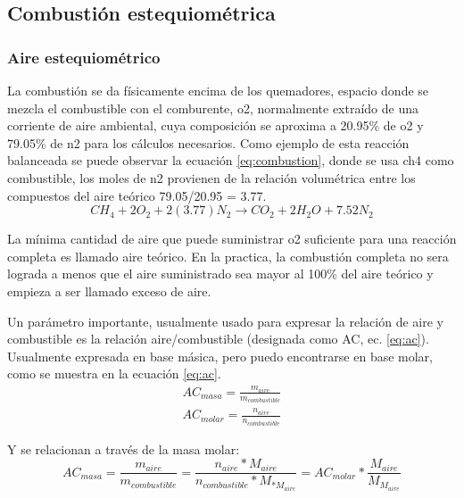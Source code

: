\subsection{Combustión estequiométrica}
\subsubsection{Aire estequiométrico}
\par La combustión se da físicamente encima de los quemadores, espacio donde se mezcla el combustible con el comburente, \ac{o2}, normalmente extraído de una corriente de aire ambiental, cuya composición se aproxima a 20.95\% de \ac{o2} y 79.05\% de \ac{n2} para los cálculos necesarios. Como ejemplo de esta reacción balanceada se puede observar la ecuación \ref{eq:combustion}, donde se usa \ac{ch4} como combustible, los moles de \ac{n2} provienen de la relación volumétrica entre los compuestos del aire teórico 79.05/20.95 = 3.77.
\begin{equation}
    \label{eq:combustion}
    CH_4 + 2O_2 + 2(3.77)N_2 \rightarrow CO_2 + 2H_2O + 7.52N_2
\end{equation}
\par La mínima cantidad de aire que puede suministrar \ac{o2} suficiente para una reacción completa es llamado aire teórico. En la practica, la combustión completa no sera lograda a menos que el aire suministrado sea mayor al 100\% del aire teórico y empieza a ser llamado exceso de aire.
\par Un parámetro importante, usualmente usado para expresar la relación de aire y combustible es la relación aire/combustible (designada como AC, ec. \ref{eq:ac}). Usualmente expresada en base másica, pero puedo encontrarse en base molar, como se muestra en la ecuación \ref{eq:ac}.
\begin{gather}
\label{eq:ac}
    AC_{masa} = \frac{m_{aire}}{m_{combustible}}\\
    AC_{molar} = \frac{n_{aire}}{n_{combustible}}
\end{gather}
\par Y se relacionan a través de la masa molar:
\begin{equation}
\label{eq:ac_rel}
    AC_{masa} = \frac{m_{aire}}{m_{combustible}} =
    \frac{n_{aire}*M_{aire}}{n_{combustible}*M_{*M_{aire}}} = AC_{molar}*\frac{M_{aire}}{M_{M_{aire}}}
\end{equation}

